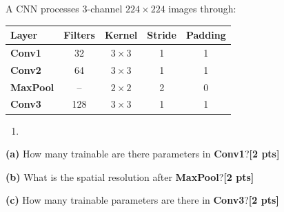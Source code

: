 \documentclass[11pt,letterpaper]{article}
\newcommand{\pts}[1]{\hfill{\color{CrimsonAccent}\bfseries[#1 pts]}}
\begin{document}
\begin{tcolorbox}[qbox]

  \medskip
  A CNN processes $3$-channel $224\!\times\!224$ images through:
  \begin{center}
  \renewcommand{\arraystretch}{1.35}
  \begin{tabular}{>{\bfseries}l c c c c}
    \toprule
    Layer   & Filters & Kernel         & Stride & Padding \\
    \midrule
    Conv1   & 32      & $3\!\times\!3$ & 1      & 1       \\
    Conv2   & 64      & $3\!\times\!3$ & 1      & 1       \\
    MaxPool & --      & $2\!\times\!2$ & 2      & 0       \\
    Conv3   & 128     & $3\!\times\!3$ & 1      & 1       \\
    \bottomrule
  \end{tabular}
  \end{center}
  
  
  \begin{enumerate}
  \item 
  \end{enumerate}

  \textbf{(a)} How many trainable are there parameters in \textbf{Conv1}?\pts{2}

  \vspace{3.0cm}

  \textbf{(b)} What is the spatial resolution after \textbf{MaxPool}?\pts{2}

  \vspace{3.0cm}

  \textbf{(c)} How many trainable parameters are there in \textbf{Conv3}?\pts{2}

  \vspace{3.0cm}
  
 

\end{tcolorbox}

\vspace{10pt}
\end{document}
